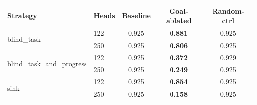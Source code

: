 \begin{tabular}{llccc}
\toprule
Strategy & Heads & Baseline & Goal-ablated & Random-ctrl \\
\midrule
\multirow{2}{*}{blind\_task} & 122 & 0.925 & \textbf{0.881} & 0.925 \\
 & 250 & 0.925 & \textbf{0.806} & 0.925 \\
\midrule
\multirow{2}{*}{blind\_task\_and\_progress} & 122 & 0.925 & \textbf{0.372} & 0.929 \\
 & 250 & 0.925 & \textbf{0.249} & 0.925 \\
\midrule
\multirow{2}{*}{sink} & 122 & 0.925 & \textbf{0.854} & 0.925 \\
 & 250 & 0.925 & \textbf{0.158} & 0.925 \\
\bottomrule
\end{tabular}
